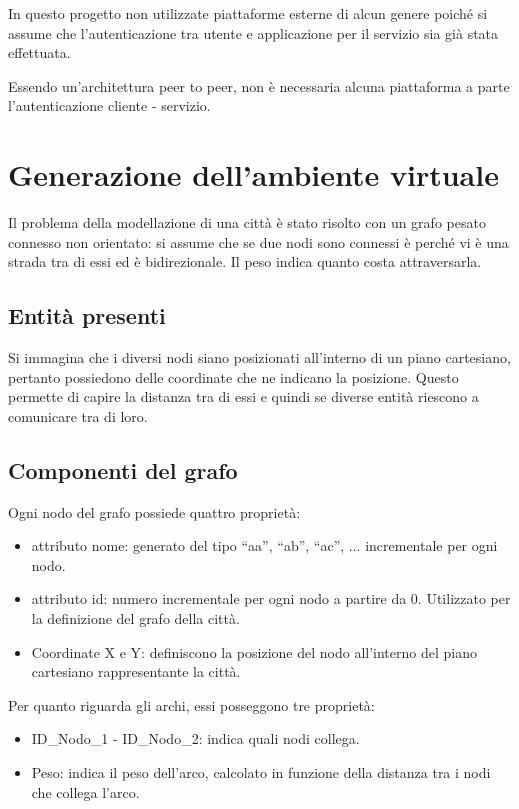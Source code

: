 In questo progetto non utilizzate piattaforme esterne di alcun genere poiché si assume che l'autenticazione tra utente e applicazione per il servizio sia già stata effettuata.

Essendo un'architettura peer to peer, non è necessaria alcuna piattaforma a parte l'autenticazione cliente - servizio.

\section{Generazione dell'ambiente virtuale}
Il problema della modellazione di una città è stato risolto con un grafo pesato connesso non orientato: si assume che se due nodi sono connessi è perché vi è una strada tra di essi ed è bidirezionale. Il peso indica quanto costa attraversarla. 

\subsection{Entità presenti}
Si immagina che i diversi nodi siano posizionati all'interno di un piano cartesiano, pertanto possiedono delle coordinate che ne indicano la posizione. Questo permette di capire la distanza tra di essi e quindi se diverse entità riescono a comunicare tra di loro.

\subsection{Componenti del grafo} \label{componenti_grafo_citta}
Ogni nodo del grafo possiede quattro proprietà:
\begin{itemize}
	\item attributo nome: generato del tipo ``aa'', ``ab'', ``ac'', ... incrementale per ogni nodo.
	\item attributo id: numero incrementale per ogni nodo a partire da 0. Utilizzato per la definizione del grafo della città.
	\item Coordinate X e Y: definiscono la posizione del nodo all'interno del piano cartesiano rappresentante la città.
\end{itemize}

Per quanto riguarda gli archi, essi posseggono tre proprietà:
\begin{itemize}
	\item ID\_Nodo\_1 - ID\_Nodo\_2: indica quali nodi collega.
	\item Peso: indica il peso dell'arco, calcolato in funzione della distanza tra i nodi che collega l'arco.
\end{itemize}

